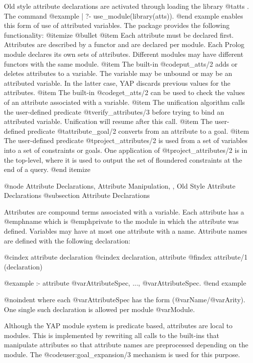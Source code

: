 {{{{{{{{{Old style attribute declarations are activated through loading the library @t{atts} . The command
@example
| ?- use_module(library(atts)).
@end example
enables this form of use of attributed variables. The package provides the
following functionality:
@itemize @bullet
@item Each attribute must be declared first. Attributes are described by a functor
and are declared per module. Each Prolog module declares its own sets of
attributes. Different modules may have different functors with the same
module.
@item The built-in @code{put_atts/2} adds or deletes attributes to a
variable. The variable may be unbound or may be an attributed
variable. In the latter case, YAP discards previous values for the
attributes.
@item The built-in @code{get_atts/2} can be used to check the values of
an attribute associated with a variable.
@item The unification algorithm calls the user-defined predicate
@t{verify_attributes/3} before trying to bind an attributed
variable. Unification will resume after this call.
@item The user-defined predicate
@t{attribute_goal/2} converts from an attribute to a goal.
@item The user-defined predicate
@t{project_attributes/2} is used from a set of variables into a set of
constraints or goals. One application of @t{project_attributes/2} is in
the top-level, where it is used to output the set of
floundered constraints at the end of a query.
@end itemize

@node Attribute Declarations, Attribute Manipulation, , Old Style Attribute Declarations
@subsection Attribute Declarations

Attributes are compound terms associated with a variable. Each attribute
has a @emph{name} which is @emph{private} to the module in which the
attribute was defined. Variables may have at most one attribute with a
name. Attribute names are defined with the following declaration:

@cindex attribute declaration
@cindex declaration, attribute
@findex attribute/1 (declaration)

@example
:- attribute @var{AttributeSpec}, ..., @var{AttributeSpec}.
@end example

@noindent
where each @var{AttributeSpec} has the form (@var{Name}/@var{Arity}).
One single such declaration is allowed per module @var{Module}.

Although the YAP module system is predicate based, attributes are local
to modules. This is implemented by rewriting all calls to the
built-ins that manipulate attributes so that attribute names are
preprocessed depending on the module.  The @code{user:goal_expansion/3}
mechanism is used for this purpose.


}}}}}}}}}

